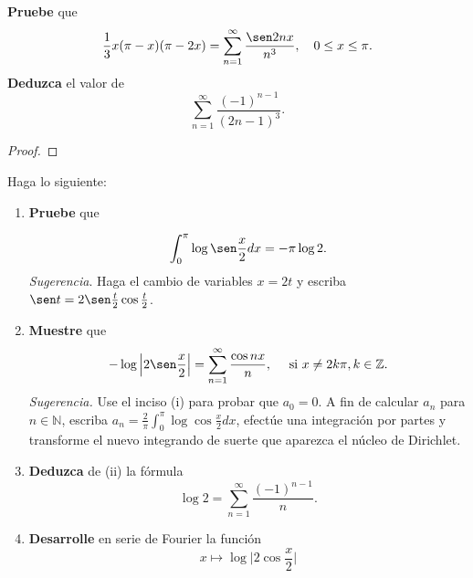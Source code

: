 \documentclass[12pt]{report}
\theoremstyle{largebreak}
\begin{document}
    \begin{excer}
        \textbf{Pruebe} que
        \begin{equation*}
            \frac{1}{3}x(\pi-x)(\pi-2x)=\sum_{ n=1}^\infty\frac{\sen 2nx}{n^3},\quad 0\leq x\leq \pi.
        \end{equation*}
        \textbf{Deduzca} el valor de
        \begin{equation*}
            \sum_{ n=1}^\infty\frac{(-1)^{ n-1}}{(2n-1)^3}.
        \end{equation*}
    \end{excer}

    \begin{proof}
        
    \end{proof}

    \renewcommand{\theenumi}{\textbf{\roman{enumi}}}
    
    \begin{excer}
        Haga lo siguiente:
        \begin{enumerate}
            \item \textbf{Pruebe} que
            
            \begin{equation*}
                \int_0^\pi\log\sen\frac{x}{2}dx=-\pi\log2.
            \end{equation*}
            \textit{Sugerencia}. Haga el cambio de variables $x=2t$ y escriba $\sen t =2\sen\frac{t}{2}\cos\frac{t}{2}$.
            \item \textbf{Muestre} que
            \begin{equation*}
                -\log\Big|2\sen\frac{x}{2}\Big|=\sum_{ n=1}^\infty\frac{\cos nx}{n},\quad\textup{ si }x\neq 2k\pi,k\in\mathbb{Z}.
            \end{equation*}
            \textit{Sugerencia.} Use el inciso (i) para probar que $a_0=0$. A fin de calcular $a_n$ para $n\in\mathbb{N}$, escriba $a_n=\frac{2}{\pi}\int_0^\pi\log\cos\frac{x}{2}dx$, efectúe una integración por partes y transforme el nuevo integrando de suerte que aparezca el núcleo de Dirichlet.
            \item \textbf{Deduzca} de (ii) la fórmula
            \begin{equation*}
                \log2=\sum_{ n=1}^\infty\frac{(-1)^{ n-1}}{n}.
            \end{equation*}
            \item \textbf{Desarrolle} en serie de Fourier la función
            \begin{equation*}
                x\mapsto\log\Big|2\cos\frac{x}{2}\Big|
            \end{equation*}
        \end{enumerate}
    \end{excer}
\end{document}
